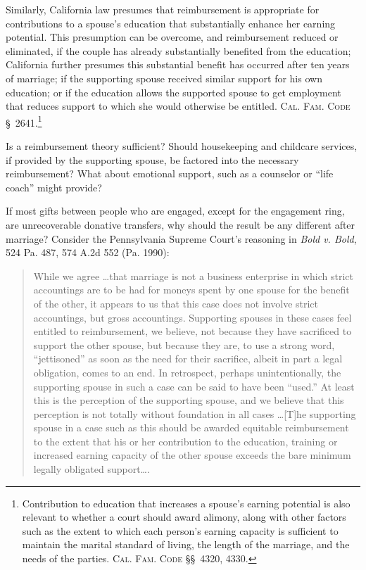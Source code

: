 Similarly, California law presumes that reimbursement is appropriate for
contributions to a spouse's education that substantially enhance her earning
potential. This presumption can be overcome, and reimbursement reduced or
eliminated, if the couple has already substantially benefited from the
education; California further presumes this substantial benefit has occurred
after ten years of marriage; if the supporting spouse received similar support
for his own education; or if the education allows the supported spouse to get
employment that reduces support to which she would otherwise be entitled.
\textsc{Cal. Fam. Code} \S~2641.\footnote{Contribution to education that
increases a spouse's earning potential is also relevant to whether a court
should award alimony, along with other factors such as the extent to which each
person's earning capacity is sufficient to maintain the marital standard of
living, the length of the marriage, and the needs of the parties. \textsc{Cal.
Fam. Code} \S\S~4320, 4330.}

Is a reimbursement theory sufficient? Should housekeeping and childcare
services, if provided by the supporting spouse, be factored into the necessary
reimbursement? What about emotional support, such as a counselor or ``life
coach'' might provide?

\item
If most gifts between people who are engaged, except for the engagement ring,
are unrecoverable donative transfers, why should the result be any different
after marriage? Consider the Pennsylvania Supreme Court's reasoning in
\emph{Bold v. Bold}, 524 Pa. 487, 574 A.2d 552 (Pa. 1990):
\begin{quote}
While we agree \dots that marriage is not a business enterprise in which
strict accountings are to be had for moneys spent by one spouse for the benefit
of the other, it appears to us that this case does not involve strict
accountings, but gross accountings. Supporting spouses in these cases feel
entitled to reimbursement, we believe, not because they have sacrificed to
support the other spouse, but because they are, to use a strong word,
``jettisoned'' as soon as the need for their sacrifice, albeit in part a legal
obligation, comes to an end. In retrospect, perhaps unintentionally, the
supporting spouse in such a case can be said to have been ``used.'' At least
this is the perception of the supporting spouse, and we believe that this
perception is not totally without foundation in all cases \dots [T]he supporting
spouse in a case such as this should be awarded equitable reimbursement to the
extent that his or her contribution to the education, training or increased
earning capacity of the other spouse exceeds the bare minimum legally obligated
support\dots.
\end{quote}


